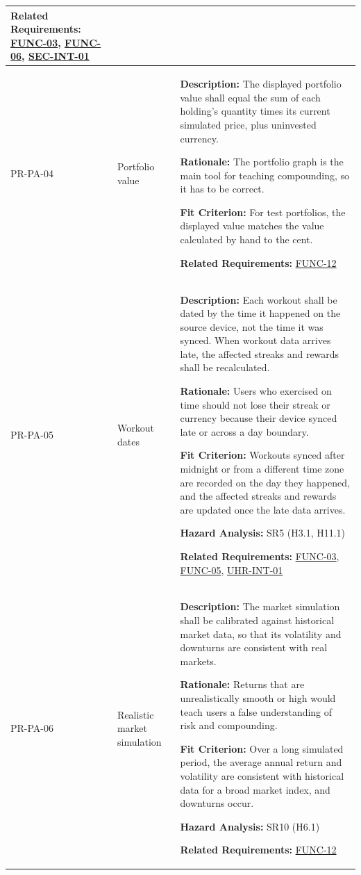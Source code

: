 \documentclass[12pt]{article}
\begin{document}
\begin{xltabular}{\textwidth}{|p{2.6cm}|p{3.4cm}|X|}
\textbf{Related Requirements:} \hyperlink{req:FUNC-03}{FUNC-03}, \hyperlink{req:FUNC-06}{FUNC-06}, \hyperlink{req:SEC-INT-01}{SEC-INT-01}\\
\hline

PR-PA-04\hypertarget{req:PR-PA-04}{} &
Portfolio value &
\textbf{Description:} The displayed portfolio value shall equal the sum of each holding's quantity times its current simulated price, plus uninvested currency.

\textbf{Rationale:} The portfolio graph is the main tool for teaching compounding, so it has to be correct.

\textbf{Fit Criterion:} For test portfolios, the displayed value matches the value calculated by hand to the cent.

\textbf{Related Requirements:} \hyperlink{req:FUNC-12}{FUNC-12}\\
\hline

PR-PA-05\hypertarget{req:PR-PA-05}{} &
Workout dates &
\textbf{Description:} Each workout shall be dated by the time it happened on the source device, not the time it was synced. When workout data arrives late, the affected streaks and rewards shall be recalculated.

\textbf{Rationale:} Users who exercised on time should not lose their streak or currency because their device synced late or across a day boundary.

\textbf{Fit Criterion:} Workouts synced after midnight or from a different time zone are recorded on the day they happened, and the affected streaks and rewards are updated once the late data arrives.

\textbf{Hazard Analysis:} SR5 (H3.1, H11.1)

\textbf{Related Requirements:} \hyperlink{req:FUNC-03}{FUNC-03}, \hyperlink{req:FUNC-05}{FUNC-05}, \hyperlink{req:UHR-INT-01}{UHR-INT-01}\\
\hline

PR-PA-06\hypertarget{req:PR-PA-06}{} &
Realistic market simulation &
\textbf{Description:} The market simulation shall be calibrated against historical market data, so that its volatility and downturns are consistent with real markets.

\textbf{Rationale:} Returns that are unrealistically smooth or high would teach users a false understanding of risk and compounding.

\textbf{Fit Criterion:} Over a long simulated period, the average annual return and volatility are consistent with historical data for a broad market index, and downturns occur.

\textbf{Hazard Analysis:} SR10 (H6.1)

\textbf{Related Requirements:} \hyperlink{req:FUNC-12}{FUNC-12}\\
\hline

\end{xltabular}
\end{document}
